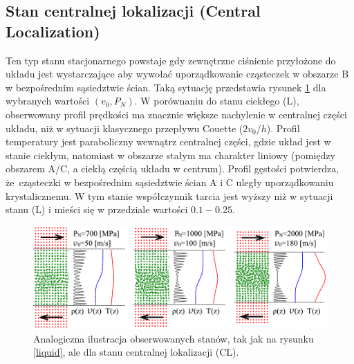 \documentclass[12pt,a4paper,openright]{report} %
\begin{document}
\subsection{Stan centralnej lokalizacji (Central Localization)}
%
Ten typ stanu stacjonarnego powstaje gdy zewnętrzne ciśnienie przyłożone do układu jest wystarczające aby wywołać uporządkowanie cząsteczek w obszarze B w bezpośrednim sąsiedztwie ścian. Taką sytuację przedstawia rysunek \ref{CL} dla wybranych wartości $(v_0, P_N)$. W porównaniu do stanu ciekłego (L), obserwowany profil prędkości ma znacznie większe nachylenie w centralnej części układu, niż w sytuacji klasycznego przepływu Couette ($2v_0 / h$). Profil temperatury jest paraboliczny wewnątrz centralnej części, gdzie układ jest w stanie ciekłym, natomiast w obszarze stałym ma charakter liniowy (pomiędzy obszarem A/C, a ciekłą częścią układu w centrum). Profil gęstości potwierdza, że~cząsteczki w bezpośrednim sąsiedztwie ścian A i C uległy uporządkowaniu krystalicznemu. W tym stanie współczynnik tarcia jest wyższy niż w sytuacji stanu (L) i mieści się w przedziale wartości $0.1-0.25$. 
%
\begin{figure}
\centering
\includegraphics[width=160mm]{rysunki/PRE16_fig3.pdf}
\caption{Analogiczna ilustracja obserwowanych stanów, tak jak na rysunku \ref{liquid}, ale dla stanu centralnej lokalizacji (CL). }
\label{CL}
\end{figure}
%
\end{document}
